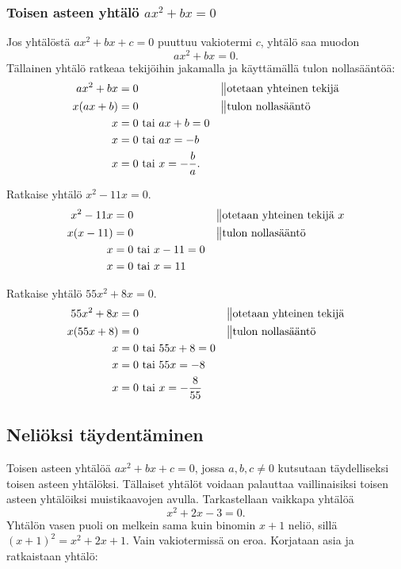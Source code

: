 \subsubsection*{Toisen asteen yhtälö $ax^2+bx=0$}
Jos yhtälöstä $ax^2+bx+c=0$ puuttuu vakiotermi $c$, yhtälö saa muodon 
$$ax^2+bx=0.$$ Tällainen yhtälö ratkeaa tekijöihin jakamalla ja käyttämällä tulon nollasääntöä:
\begin{align*}
ax^2+bx&=0 \ \ \ \ \ &&\big\|\text{otetaan yhteinen tekijä} \\
x(ax+b)&=0 \ \ \ \ \ &&\big\|\text{tulon nollasääntö} \\
x&=0 \text{ tai } ax+b=0 \\
x&=0 \text{ tai } ax=-b \\
x&=0 \text{ tai } x=-\frac{b}{a}.
\end{align*}
\begin{esimerkki}
Ratkaise yhtälö $x^2-11x=0$.
\begin{align*}
x^2-11x&=0 \ \ \ \ \  &&\big\|\text{otetaan yhteinen tekijä } x\\
x(x-11)&=0 \ \ \ \ \ &&\big\|\text{tulon nollasääntö} \\
x&=0 \text{ tai } x-11=0 \\
x&=0 \text{ tai } x=11
\end{align*}
\end{esimerkki}

\begin{esimerkki}
Ratkaise yhtälö $55x^2+8x=0$.
\begin{align*}
55x^2+8x&=0 \ \ \ \ \ &&\big\|\text{otetaan yhteinen tekijä} \\
x(55x+8)&=0 \ \ \ \ \ &&\big\|\text{tulon nollasääntö} \\
x&=0 \text{ tai } 55x+8=0 \\
x&=0 \text{ tai } 55x=-8 \\
x&=0 \text{ tai } x=-\frac{8}{55}
\end{align*}
\end{esimerkki}

\subsection*{Neliöksi täydentäminen}
Toisen asteen yhtälöä $ax^2+bx+c=0$, jossa $a,b,c \neq 0$ kutsutaan
täydelliseksi toisen asteen yhtälöksi. Tällaiset yhtälöt voidaan palauttaa
vaillinaisiksi toisen asteen yhtälöiksi muistikaavojen avulla.
Tarkastellaan vaikkapa yhtälöä
\[x^2+2x-3=0.\]
Yhtälön vasen puoli on melkein sama kuin binomin $x+1$ neliö, sillä $(x+1)^2=x^2+2x+1$.
Vain vakiotermissä on eroa. Korjataan asia ja ratkaistaan yhtälö:

